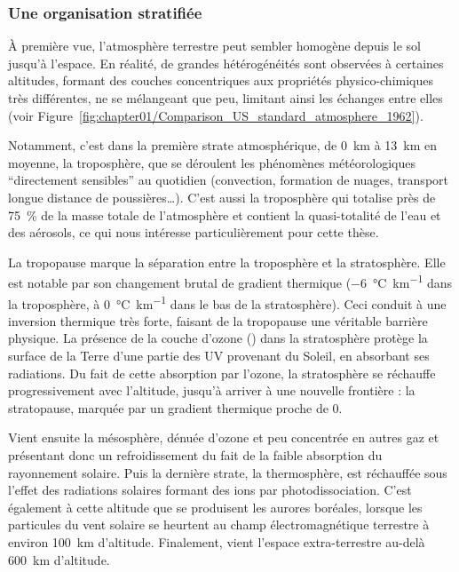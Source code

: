 \subsubsection{Une organisation stratifiée}%
\label{ssub:une_organisation_stratifiée}

À première vue, l'atmosphère terrestre peut sembler homogène depuis le sol jusqu'à
l'espace. En réalité, de grandes hétérogénéités sont observées à certaines altitudes,
formant des couches concentriques aux propriétés physico-chimiques très différentes, ne se
mélangeant que peu, limitant ainsi les échanges entre elles (voir
Figure~\ref{fig:chapter01/Comparison_US_standard_atmosphere_1962}).

Notamment, c'est dans la première strate atmosphérique, de \SI{0}{km} à \SI{13}{km} en
moyenne, la troposphère, que se déroulent les phénomènes météorologiques
``directement sensibles'' au quotidien
(convection, formation de nuages, transport longue distance de poussières…).
C'est aussi la troposphère qui totalise près de \SI{75}{\percent} de la masse totale
de l'atmosphère et contient la quasi-totalité de l'eau et des aérosols, ce qui nous
intéresse particulièrement pour cette thèse.

La tropopause marque la séparation entre la troposphère et la stratosphère. Elle est
notable par son changement brutal de gradient thermique (\SI{-6}{\degreeCelsius\per\km}
dans la troposphère, à \SI{0}{\degreeCelsius\per\km} dans le bas de la stratosphère).
Ceci conduit à une inversion thermique très forte, faisant de la tropopause une véritable
barrière physique. La présence de la couche d'ozone () dans la stratosphère
protège la surface de la Terre d'une partie des UV provenant du Soleil, en absorbant ses
radiations. Du fait de cette absorption par l'ozone, la stratosphère se réchauffe
progressivement avec l'altitude, jusqu'à arriver à une nouvelle frontière : la
stratopause, marquée par un gradient thermique proche de 0.

Vient ensuite la mésosphère, dénuée d'ozone et peu concentrée en autres gaz et présentant
donc un refroidissement du fait de la faible absorption du rayonnement solaire. Puis la
dernière strate, la thermosphère, est réchauffée sous l'effet des radiations solaires
formant des ions par photodissociation.
C'est également à cette altitude que se produisent les aurores boréales, lorsque les
particules du vent solaire se heurtent au champ électromagnétique terrestre à environ
\SI{100}{km} d'altitude. Finalement, vient l'espace extra-terrestre au-delà \SI{600}{km}
d'altitude.

